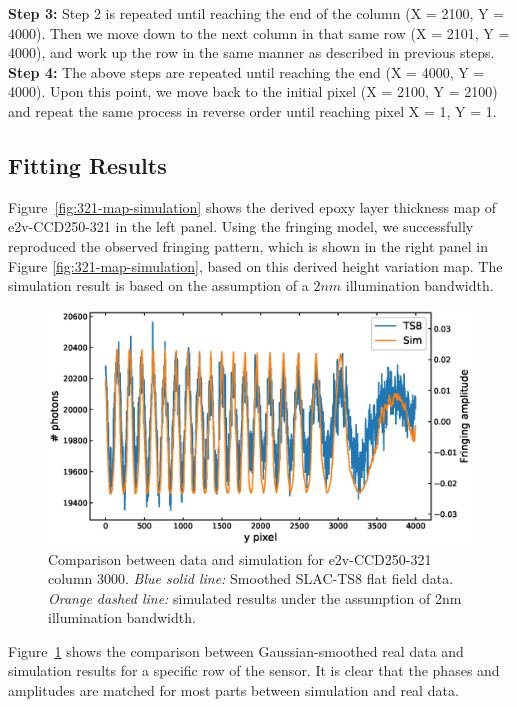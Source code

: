 \documentclass[twocolumn]{aastex63} %
\begin{document}
\begin{CJK*}{UTF8}{gbsn}
\textbf{Step 3:} Step 2 is repeated until reaching the end of the column (X = 2100, Y = 4000). Then we move down to the next column in that same row (X = 2101, Y = 4000), and work up the row in the same manner as described in previous steps. \\
\textbf{Step 4:} The above steps are repeated until reaching the end (X = 4000, Y = 4000). Upon this point, we move back to the initial pixel (X = 2100, Y = 2100) and repeat the same process in reverse order until reaching pixel X = 1, Y = 1. 


\subsection{Fitting Results}
Figure~\ref{fig:321-map-simulation} shows the derived epoxy layer thickness map of e2v-CCD250-321 in the left panel. Using the fringing model, we successfully reproduced the observed fringing pattern, which is shown in the right panel in Figure \ref{fig:321-map-simulation}, based on this derived height variation map. The simulation result is based on the assumption of a $2nm$ illumination bandwidth.
\begin{figure}[hbt]
\centering
\includegraphics[scale = 0.4]{E2V-321-detail-compare.eps}
\caption{Comparison between data and simulation for e2v-CCD250-321 column 3000. {\it Blue solid line:} Smoothed SLAC-TS8 flat field data. {\it Orange dashed line:} simulated results under the assumption of 2nm illumination bandwidth.}
\label{fig:321-detail-compare}
\end{figure}
Figure~\ref{fig:321-detail-compare} shows the comparison between Gaussian-smoothed real data and simulation results for a specific row of the sensor. It is clear that the phases and amplitudes are matched for most parts between simulation and real data.



\end{CJK*}
\end{document}
